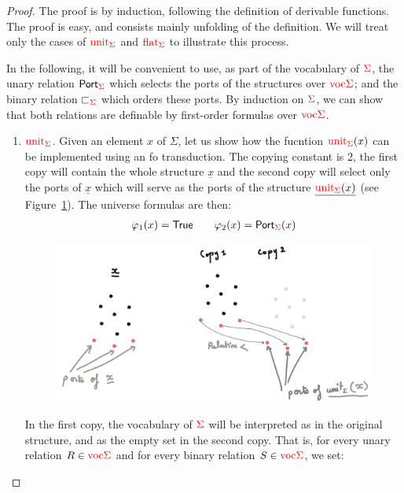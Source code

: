     \begin{proof}
    The proof is by induction, following the definition of derivable functions. The proof is easy, and consists mainly unfolding of the definition. We will treat only the cases of ${\color{red}{\mathrm{unit}}}_{\color{red}{\Sigma}}$ and ${\color{red}{\mathrm{flat}}}_{\color{red}{\Sigma}}$ to illustrate this process.
    
    In the following, it will be convenient to use, as part of the vocabulary of ${\color{red}{\Sigma}}$, the unary relation  $\mathsf{Port}_{\color{red}{\Sigma}}$ which selects the ports of the structures over ${\color{red}{\mathrm{voc}}}{\color{red}{\Sigma}}$; and the binary relation $\sqsubset_{\color{red}{\Sigma}}$ which orders these ports. By induction on ${\color{red}{\Sigma}}$, we can show that both relations are definable by first-order formulas over  ${\color{red}{\mathrm{voc}}}{\color{red}{\Sigma}}$.
    
    \begin{enumerate}
    \item ${\color{red}{\mathrm{unit}}}_{\color{red}{\Sigma}}$. Given an element $x$ of $\Sigma$, let us show how the fucntion ${\color{red}{\mathrm{unit}}}_{\color{red}{\Sigma}}(x)$ can be implemented using an fo transduction.  The copying constant is 2,
    the first copy will contain the whole structure $\underline{x}$ and the second copy will select only the ports of $\underline{x}$ which will serve as the ports of the structure $\underline{{\color{red}{\mathrm{unit}}}_{\color{red}{\Sigma}}(x)}$ (see Figure~\ref{fig:transductionUnit}).  The universe formulas are then:
    \begin{align*}
    \varphi_1(x)=\mathsf{True} \qquad \varphi_2(x)=\mathsf{Port}_{\color{red}{\Sigma}}(x)
    \end{align*}
    \begin{figure}
    \includegraphics[scale=.1]{MyPic8.jpg}
    \caption{}\label{fig:transductionUnit}
    \end{figure}
    In the first copy, the vocabulary of ${\color{red}{\Sigma}}$ will be interpreted as in the original structure, and as the empty set in the second copy. That is, for every unary relation $R\in {\color{red}{\mathrm{voc}}}{\color{red}{\Sigma}}$ and for every binary relation $S \in {\color{red}{\mathrm{voc}}}{\color{red}{\Sigma}}$, we set:

\end{enumerate}
\end{proof}
